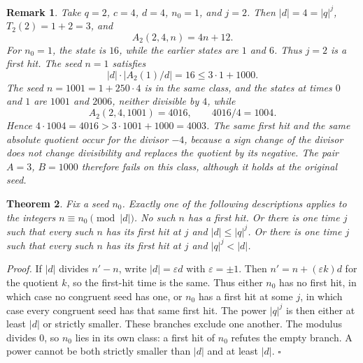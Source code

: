 \documentclass[11pt,letterpaper]{article}
\newtheorem{theorem}{Theorem}
\newtheorem{remark}[theorem]{Remark}
\newenvironment{proof}{\noindent\textit{Proof.}}{\hfill\(\square\)}
\begin{document}
\begin{remark}
\label{rem:example}
Take \(q=2\), \(c=4\), \(d=4\), \(n_0=1\), and \(j=2\). Then \(|d|=4=|q|^j\),
\(T_2(2)=1+2=3\), and
\[
A_2(2,4,n)=4n+12.
\]
For \(n_0=1\), the state is \(16\), while the earlier states are \(1\) and
\(6\). Thus \(j=2\) is a first hit. The seed \(n=1\) satisfies
\[
|d|\cdot |A_2(1)/d|=16\le 3\cdot 1+1000.
\]
The seed \(n=1001=1+250\cdot 4\) is in the same class, and the states at times
\(0\) and \(1\) are \(1001\) and \(2006\), neither divisible by \(4\), while
\[
A_2(2,4,1001)=4016,\qquad 4016/4=1004.
\]
Hence \(4\cdot 1004=4016>3\cdot 1001+1000=4003\). The same first hit and the
same absolute quotient occur for the divisor \(-4\), because a sign change of
the divisor does not change divisibility and replaces the quotient by its
negative. The pair \(A=3\), \(B=1000\) therefore fails on this class, although
it holds at the original seed.
\end{remark}

\begin{theorem}
\label{thm:trichotomy}
Fix a seed \(n_0\). Exactly one of the following descriptions applies to the
integers \(n\equiv n_0\pmod{|d|}\). No such \(n\) has a first hit. Or there
is one time \(j\) such that every such \(n\) has its first hit at \(j\) and
\(|d|\le |q|^j\). Or there is one time \(j\) such that every such \(n\) has
its first hit at \(j\) and \(|q|^j<|d|\).
\end{theorem}

\begin{proof}
If \(|d|\) divides \(n'-n\), write \(|d|=\varepsilon d\) with
\(\varepsilon=\pm 1\). Then \(n' = n+(\varepsilon k)d\) for the quotient
\(k\), so the first-hit time is the same. Thus either \(n_0\) has no first
hit, in which case no congruent seed has one, or \(n_0\) has a first hit at
some \(j\), in which case every congruent seed has that same first hit. The
power \(|q|^j\) is then either at least \(|d|\) or strictly smaller. These
branches exclude one another. The modulus divides \(0\), so \(n_0\) lies in
its own class: a first hit of \(n_0\) refutes the empty branch. A power cannot
be both strictly smaller than \(|d|\) and at least \(|d|\).
\end{proof}
\end{document}
